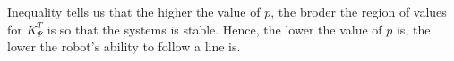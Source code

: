 Inequality \label{eq:14.2} tells us that the higher the value of $p$, the broder
the region of values for $K_{\Psi}^T$ is so that the systems is stable. Hence,
the lower the value of $p$ is, the lower the robot's ability to follow a line
is.
